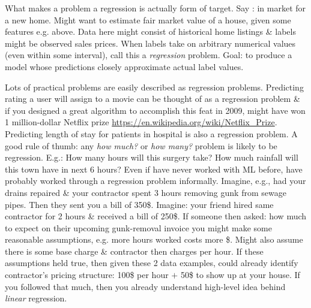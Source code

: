 \documentclass{article}
\begin{document}
\begin{itemize}
\begin{itemize}
\begin{itemize}
\begin{itemize}
				What makes a problem a regression is actually form of target. Say : in market for a new home. Might want to estimate fair market value of a house, given some features e.g. above. Data here might consist of historical home listings \& labels might be observed sales prices. When labels take on arbitrary numerical values (even within some interval), call this a {\it regression} problem. Goal: to produce a model whose predictions closely approximate actual label values.

				Lots of practical problems are easily described as regression problems. Predicting rating a user will assign to a movie can be thought of as a regression problem \& if you designed a great algorithm to accomplish this feat in 2009, might have won 1 million-dollar Netflix prize \url{https://en.wikipedia.org/wiki/Netflix_Prize}. Predicting length of stay for patients in hospital is also a regression problem. A good rule of thumb: any {\it how much?} or {\it how many?} problem is likely to be regression. E.g.: How many hours will this surgery take? How much rainfall will this town have in next 6 hours? Even if have never worked with ML before, have probably worked through a regression problem informally. Imagine, e.g., had your drains repaired \& your contractor spent 3 hours removing gunk from sewage pipes. Then they sent you a bill of 350\$. Imagine: your friend hired same contractor for 2 hours \& received a bill of 250\$. If someone then asked: how much to expect on their upcoming gunk-removal invoice you might make some reasonable assumptions, e.g. more hours worked costs more \$. Might also assume there is some base charge \& contractor then charges per hour. If these assumptions held true, then given these 2 data examples, could already identify contractor's pricing structure: 100\$ per hour $+$ 50\$ to show up at your house. If you followed that much, then you already understand high-level idea behind {\it linear} regression.


\end{itemize}
\end{itemize}
\end{itemize}
\end{itemize}
\end{document}
